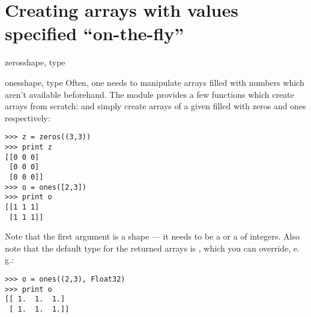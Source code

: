 \newpage
\section{Creating arrays with values specified ``on-the-fly''}
\label{sec:creating-arrays-on-the-fly}

\begin{funcdesc}{zeros}{shape, type}
\end{funcdesc}
\begin{funcdesc}{ones}{shape, type}
   Often, one needs to manipulate arrays filled with numbers which aren't
   available beforehand. The \module{\numarray} module provides a few functions
   which create arrays from scratch:  and 
   simply create arrays of a given  filled with zeros and ones
   respectively:
\begin{verbatim}
>>> z = zeros((3,3))
>>> print z
[[0 0 0]
 [0 0 0]
 [0 0 0]]
>>> o = ones([2,3])
>>> print o
[[1 1 1]
 [1 1 1]]
\end{verbatim}
   Note that the first argument is a shape --- it needs to be a  or
   a  of integers. Also note that the default type for the
   returned arrays is , which you can override, e. g.: 
\begin{verbatim}
>>> o = ones((2,3), Float32)
>>> print o
[[ 1.  1.  1.]
 [ 1.  1.  1.]]
\end{verbatim}
\end{funcdesc}



